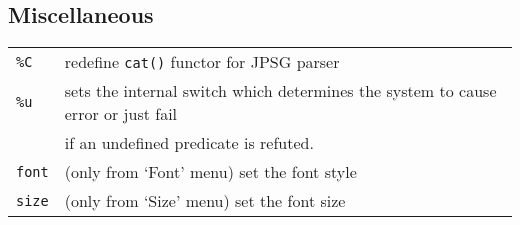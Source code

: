 \subsection{Miscellaneous}
\begin{tabular}{ll}
{\tt \%C}	& redefine {\tt cat()} functor for JPSG parser\\
{\tt \%u}       & sets the internal switch which determines the system
to cause error or just fail\\
        &  if an undefined predicate is refuted.\\
{\tt font}      & (only from `Font' menu) set the font style\\
{\tt size}      & (only from `Size' menu) set the font size\\
\end{tabular}

